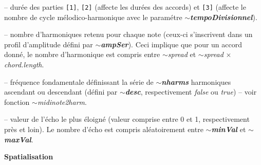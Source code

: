 \begin{description}[font=\normalfont\space,itemsep=10pt]
\item[\texttt{[1][2][3]}] 
\hfill
\begin{description}[font=\itshape\space,leftmargin=*]
\item[$\sim$\textsl{partDur}]-- dur\'ee des parties \texttt{[1]}, \texttt{[2]} (affecte les dur\'ees des accords) et \texttt{[3]} (affecte le nombre de cycle m\'elodico-harmonique avec le param\'etre \textbf{$\sim$\textsl{tempoDivisionnel}}). 
\end{description}

\item[\texttt{[1][2]}] 
\hfill
\begin{description}[font=\itshape\space,leftmargin=*]
\item[$\sim$\textsl{spread}]-- nombre d'harmoniques retenu pour chaque note (ceux-ci s'inscrivent dans un profil d'amplitude d\'efini par \textbf{$\sim$\textsl{ampSer}}). Ceci implique que pour un accord donn\'e, le nombre d'harmonique est compris entre $\sim$\textsl{spread} et $\sim$\textsl{spread} $\times$ \textsl{chord.length}.
\item[$\sim$\textsl{freqRoot}]-- fr\'equence fondamentale d\'efinissant la s\'erie de \textbf{$\sim$\textsl{nharms}} harmoniques ascendant ou descendant (d\'efini par \textbf{$\sim$\textsl{desc}}, respectivement \textsl{false} ou \textsl{true}) -- voir fonction $\sim$\textsl{midinote2harm}.
\end{description}

\item[\texttt{[3]}] 
\hfill
\begin{description}[font=\itshape\space,leftmargin=*]
\item[$\sim$\textsl{farest}]-- valeur de l'\'echo le plus \'eloign\'e (valeur comprise entre 0 et 1, respectivement pr\`es et loin). Le nombre d'\'echo est compris al\'eatoirement entre \textbf{$\sim$\textsl{minVal}} et \textbf{$\sim$\textsl{maxVal}}.  
\end{description}

\end{description}

\smallskip

\noindent \textbf{{\large Spatialisation}}
\hrulefill

\smallskip


